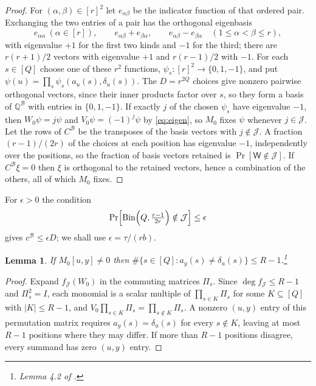 \documentclass[11pt,reqno]{amsart}
\numberwithin{equation}{section}
\theoremstyle{plain}
\newtheorem{lemma}[theorem]{Lemma}
\theoremstyle{definition}
\theoremstyle{remark}
\DeclareMathOperator{\Bin}{Bin}
\newcommand{\B}{\mathcal{B}}
\newcommand{\Q}{\mathbb{Q}}
\begin{document}
\begin{proof}
For $(\alpha,\beta)\in[r]^2$ let $e_{\alpha\beta}$ be the indicator function of
that ordered pair. Exchanging the two entries of a pair has the orthogonal
eigenbasis
\[
  e_{\alpha\alpha}\ (\alpha\in[r]),\qquad e_{\alpha\beta}+e_{\beta\alpha},\qquad
  e_{\alpha\beta}-e_{\beta\alpha}\quad(1\le\alpha<\beta\le r),
\]
with eigenvalue $+1$ for the first two kinds and $-1$ for the third; there are
$r(r+1)/2$ vectors with eigenvalue $+1$ and $r(r-1)/2$ with $-1$. For each
$s\in[Q]$ choose one of these $r^2$ functions, $\psi_s:[r]^2\to\{0,1,-1\}$, and
put $\psi(u)=\prod_{s}\psi_s(a_u(s),\delta_u(s))$. The $D=r^{2Q}$ choices give
nonzero pairwise orthogonal vectors, since their inner products factor over $s$,
so they form a basis of $\Q^{\B}$ with entries in $\{0,1,-1\}$. If exactly $j$ of
the chosen $\psi_s$ have eigenvalue $-1$, then $W_0\psi=j\psi$ and
$V_0\psi=(-1)^j\psi$ by \eqref{eq:eigen}, so $M_0$ fixes $\psi$ whenever
$j\in\mathcal J$. Let the rows of $C^{\B}$ be the transposes of the basis vectors
with $j\notin\mathcal J$. A fraction $(r-1)/(2r)$ of the choices at each position
has eigenvalue $-1$, independently over the positions, so the fraction of basis
vectors retained is $\Pr[\mathsf W\notin\mathcal J]$. If $C^{\B}\xi=0$ then $\xi$
is orthogonal to the retained vectors, hence a combination of the others, all of
which $M_0$ fixes.
\end{proof}

For $\epsilon>0$ the condition
\begin{equation}\label{eq:tail}
  \Pr\Bigl[\Bin\Bigl(Q,\tfrac{r-1}{2r}\Bigr)\notin\mathcal J\Bigr]\le\epsilon
\end{equation}
gives $c^{\B}\le\epsilon D$; we shall use $\epsilon=\tau/(rb)$.

\begin{lemma}\label{lem:mismatch}
If $M_0[u,y]\ne0$ then $\#\{s\in[Q]:a_y(s)\ne\delta_u(s)\}\le R-1$.\footnote{Lemma
4.2 of \cite{OAI26}.}
\end{lemma}

\begin{proof}
Expand $f_{\mathcal J}(W_0)$ in the commuting matrices $\Pi_s$. Since
$\deg f_{\mathcal J}\le R-1$ and $\Pi_s^2=I$, each monomial is a scalar multiple
of $\prod_{s\in K}\Pi_s$ for some $K\subseteq[Q]$ with $|K|\le R-1$, and
$V_0\prod_{s\in K}\Pi_s=\prod_{s\notin K}\Pi_s$. A nonzero $(u,y)$ entry of this
permutation matrix requires $a_y(s)=\delta_u(s)$ for every $s\notin K$, leaving at
most $R-1$ positions where they may differ. If more than $R-1$ positions disagree,
every summand has zero $(u,y)$ entry.
\end{proof}
\end{document}

